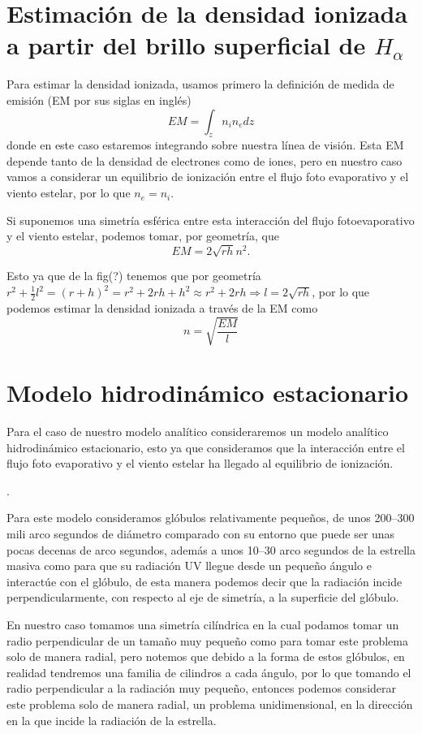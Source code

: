 \documentclass{book}
\begin{document}
\section{Estimación de la densidad ionizada a partir del brillo superficial de $H_\alpha$}

Para estimar la densidad ionizada, usamos primero la definición de medida de emisión (EM por sus siglas en inglés)
\[EM=\int_z n_in_edz\] donde en este caso estaremos integrando sobre nuestra línea de visión. Esta EM depende tanto de la densidad de electrones como de iones, pero en nuestro caso vamos a considerar un equilibrio de ionización entre el flujo foto evaporativo y el viento estelar, por lo que $n_e=n_i$.

Si suponemos una simetría esférica entre esta interacción del flujo fotoevaporativo y el viento estelar, podemos tomar, por geometría, que
\[EM=2\sqrt{rh}n^2.\]


Esto ya que de la fig(?) tenemos que por geometría $r^2+\frac{1}{2}l^2=(r+h)^2=r^2+2rh+h^2\approx r^2+2rh\Rightarrow l=2\sqrt{rh}$, por lo que podemos estimar la densidad ionizada a través de la EM como \[n=\sqrt{\frac{EM}{l}}\]

\section{Modelo hidrodinámico estacionario}

Para el caso de nuestro modelo analítico consideraremos un modelo analítico hidrodinámico estacionario, esto ya que consideramos que la interacción entre el flujo foto evaporativo y el viento estelar ha llegado al equilibrio de ionización.

.

Para este modelo consideramos glóbulos relativamente pequeños, de unos 200--300 mili arco segundos de diámetro comparado con su entorno que puede ser unas pocas decenas de arco segundos, además a unos 10--30 arco segundos de la estrella masiva como para que su radiación UV llegue desde un pequeño ángulo e interactúe con el glóbulo, de esta manera podemos decir que la radiación incide perpendicularmente, con respecto al eje de simetría, a la superficie del glóbulo.

En nuestro caso tomamos una simetría cilíndrica en la cual podamos tomar un radio perpendicular de un tamaño muy pequeño como para tomar este problema solo de manera radial, pero notemos que debido a la forma de estos glóbulos, en realidad tendremos una familia de cilindros a cada ángulo, por lo que tomando el radio perpendicular a la radiación muy pequeño, entonces podemos considerar este problema solo de manera radial, un problema unidimensional, en la dirección en la que incide la radiación de la estrella.
\end{document}
